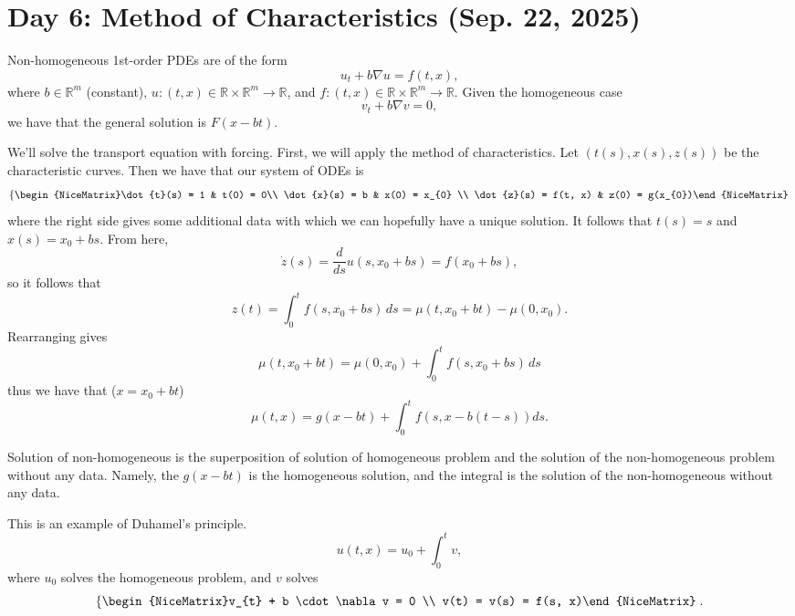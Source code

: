 \section{Day 6: Method of Characteristics (Sep. 22, 2025)}
\begin{theorem} 
	Non-homogeneous 1st-order PDEs are of the form
	\[ u_{t} + b \nabla u = f(t, x), \]
	where \( b \in \mathbb{R}^{m} \) (constant), \( u : (t, x) \in \mathbb{R} \times \mathbb{R}^{m} \to \mathbb{R} \), and \( f : (t, x) \in \mathbb{R} \times \mathbb{R}^{m} \to \mathbb{R} \). Given the homogeneous case
	\[ v_{t} + b \nabla v = 0, \]
	we have that the general solution is \( F(x - bt) \). 

	We'll solve the transport equation with forcing. First, we will apply the method of characteristics. Let \( (t(s), x(s), z(s)) \) be the characteristic curves. Then we have that our system of ODEs is
	\[ \left\{\begin{NiceMatrix}\dot{t}(s) = 1  & t(0) = 0\\ \dot{x}(s) = b & x(0) = x_{0} \\ \dot{z}(s) = f(t, x) & z(0) = g(x_{0})\end{NiceMatrix}\right.  \]
	where the right side gives some additional data with which we can hopefully have a unique solution. It follows that \( t(s) = s \) and \( x(s) = x_{0} +bs \). From here,
	\[ \dot{z}(s) = \frac{d}{ds} u(s, x_{0}+bs) = f(x_{0}+bs), \]
	so it follows that
	\[ z(t) = \int_{0}^{t} f(s, x_{0}+bs) \,ds = \mu(t, x_{0}+bt) - \mu(0, x_{0}).  \]
	Rearranging gives
	\[ \mu(t, x_{0}+bt) = \mu(0, x_{0}) + \int_{0}^{t} f(s, x_{0}+bs) \,ds \]
	thus we have that (\( x = x_{0} + bt \))
	\[ \mu(t, x) = g(x-bt) + \int_{0}^{t} f(s, x - b(t - s)) ds. \]
\end{theorem}
\begin{remark}
	Solution of non-homogeneous is the superposition of solution of homogeneous problem and the solution of the non-homogeneous problem without any data. Namely, the \( g(x - bt) \) is the homogeneous solution, and the integral is the solution of the non-homogeneous without any data.
\end{remark}
\begin{remark}
	This is an example of Duhamel's principle. 
	\[ u(t, x) = u_{0} + \int_{0}^{t} v, \]
	where \( u_{0} \) solves the homogeneous problem, and \( v \) solves
	\[ \left\{\begin{NiceMatrix}v_{t} + b \cdot \nabla v = 0 \\ v(t) = v(s) = f(s, x)\end{NiceMatrix}\right..  \]
\end{remark}

